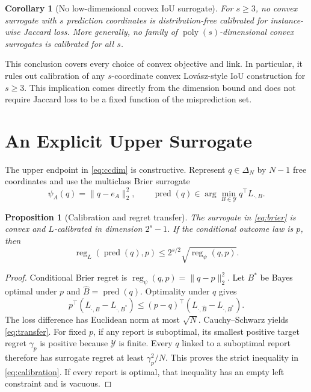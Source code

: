\documentclass[twoside]{article}
\newtheorem{proposition}[theorem]{Proposition}
\newtheorem{corollary}[theorem]{Corollary}
\newcommand{\Y}{\mathcal Y}
\newcommand{\simplex}{\Delta}
\newcommand{\1}{\mathbf 1}
\begin{document}
\begin{corollary}[No low-dimensional convex IoU surrogate]
For $s\geq3$, no convex surrogate with $s$ prediction coordinates is distribution-free calibrated for instance-wise Jaccard loss. More generally, no family of $\operatorname{poly}(s)$-dimensional convex surrogates is calibrated for all $s$.
\end{corollary}

This conclusion covers every choice of convex objective and link. In particular, it rules out calibration of any $s$-coordinate convex Lov\'asz-style IoU construction for $s\geq3$. This implication comes directly from the dimension bound and does not require Jaccard loss to be a fixed function of the misprediction set.

\section{An Explicit Upper Surrogate}

The upper endpoint in \eqref{eq:ccdim} is constructive. Represent $q\in\simplex_N$ by $N-1$ free coordinates and use the multiclass Brier surrogate
\begin{equation}
\psi_A(q)=\|q-e_A\|_2^2,
\qquad
\operatorname{pred}(q)\in\arg\min_{B\in\Y}q^\top L_{\cdot,B}.
\label{eq:brier}
\end{equation}

\begin{proposition}[Calibration and regret transfer]
\label{prop:brier}
The surrogate in \eqref{eq:brier} is convex and $L$-calibrated in dimension $2^s-1$. If the conditional outcome law is $p$, then
\begin{equation}
\operatorname{reg}_L(\operatorname{pred}(q),p)
\leq
2^{s/2}\sqrt{\operatorname{reg}_\psi(q,p)}.
\label{eq:transfer}
\end{equation}
\end{proposition}

\begin{proof}
Conditional Brier regret is $\operatorname{reg}_\psi(q,p)=\|q-p\|_2^2$. Let $B^*$ be Bayes optimal under $p$ and $\widehat B=\operatorname{pred}(q)$. Optimality under $q$ gives
\begin{equation}
p^\top(L_{\cdot,\widehat B}-L_{\cdot,B^*})
\leq
(p-q)^\top(L_{\cdot,\widehat B}-L_{\cdot,B^*}).
\end{equation}
The loss difference has Euclidean norm at most $\sqrt N$. Cauchy--Schwarz yields \eqref{eq:transfer}. For fixed $p$, if any report is suboptimal, its smallest positive target regret $\gamma_p$ is positive because $\Y$ is finite. Every $q$ linked to a suboptimal report therefore has surrogate regret at least $\gamma_p^2/N$. This proves the strict inequality in \eqref{eq:calibration}. If every report is optimal, that inequality has an empty left constraint and is vacuous.
\end{proof}
\end{document}
